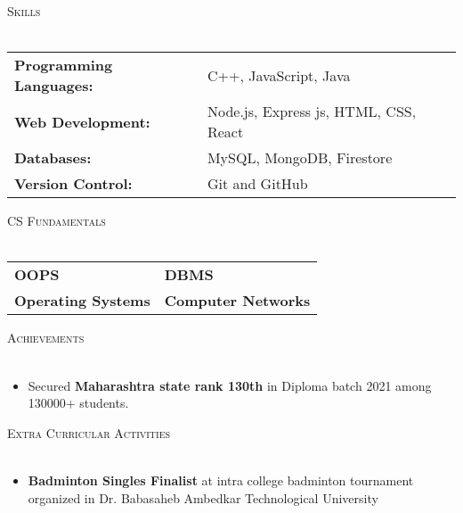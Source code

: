 \documentclass[a4paper]{article}
\newcommand{\lineunder} {
    \vspace*{-8pt} \\
    \hspace*{-18pt} \hrulefill \\
}
\newcommand{\header} [1] {
    {\hspace*{-18pt}\vspace*{6pt} \textsc{#1}}
    \vspace*{-6pt} \lineunder
}
\begin{document}

\header{Skills}
\vspace{2mm}
\begin{tabular}{ l l }
        \vspace{2mm}
	\textbf{Programming Languages:} & C++, JavaScript, Java\\ 
        \vspace{2mm}
	\textbf{Web Development:} & Node.js, Express js, HTML, CSS, React\\
        \vspace{2mm}
	\textbf{Databases: } & MySQL, MongoDB, Firestore\\
        \vspace{2mm}
	\textbf{Version Control:} &Git and GitHub \\

\end{tabular}
\vspace{4mm}


\header{CS Fundamentals}
\vspace{2mm}
\begin{tabular}{ l l }
        \vspace{2mm}
	\textbf{OOPS} & \hspace{2cm} \textbf{DBMS}\\ 
        \vspace{2mm}
	\textbf{Operating Systems} & \hspace{2cm} \textbf{Computer Networks}\\
\end{tabular}
\vspace{3mm}



\header{Achievements}
\vspace{1mm}
\begin{itemize} \itemsep 0.5pt
\item Secured \textbf{Maharashtra state rank 130th} in Diploma batch 2021 among 130000+ students.
\end{itemize}
\vspace{2mm}

\header{Extra Curricular Activities}
\vspace{1mm}
\begin{itemize} \itemsep 0.5pt
\item \textbf{Badminton Singles Finalist} at intra college badminton tournament organized in Dr. Babasaheb Ambedkar Technological University
\end{itemize}
\end{document}
